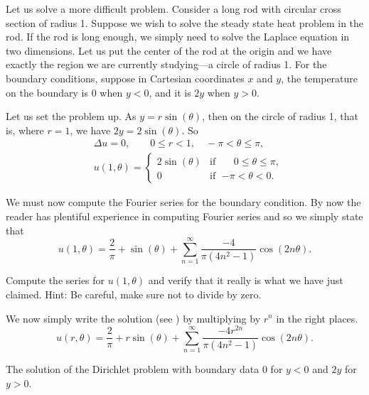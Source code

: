 \begin{example}
Let us solve a more difficult problem.  Consider a long
rod with circular cross section of radius 1.  Suppose we wish to solve the
steady state heat problem in the rod.
If the rod is long enough, we simply need to solve
the Laplace equation in two dimensions.  Let us put the center of the rod at
the origin and we have exactly the region we are currently
studying---a circle of radius 1.  For the boundary conditions, suppose in
Cartesian coordinates $x$ and
$y$, the temperature on the boundary is 0 when $y < 0$, and it is $2y$ when $y > 0$.

Let us set the problem up.
As $y = r\sin(\theta)$, then on the
circle of radius 1, that is, where $r=1$, we have $2y = 2\sin(\theta)$.  So
\begin{align*}
& \Delta u = 0 , \qquad 0 \leq r < 1, \quad -\pi < \theta \leq \pi,\\
& u(1,\theta) = 
\begin{cases}
2\sin(\theta) & \text{if } \; \phantom{-}0 \leq \theta \leq \pi, \\
0 & \text{if } \; {-\pi} < \theta < 0.
\end{cases}
\end{align*}

We must now compute the Fourier series for the boundary
condition.  By now the reader has plentiful experience in computing
Fourier series and so we simply state that 
\begin{equation*}
u(1,\theta) = 
\frac{2}{\pi}
+
\sin(\theta)
+
\sum_{n=1}^\infty \frac{-4}{\pi(4n^2-1)} \cos(2n\theta) .
\end{equation*}

\begin{exercise}
Compute the series for $u(1,\theta)$ and verify that it really is what
we have just claimed.  Hint: Be careful, make sure not to divide by zero.
\end{exercise}

We now simply write the solution (see ) by multiplying by $r^n$ in the right places.
\begin{equation*}
u(r,\theta) = 
\frac{2}{\pi}
+
r\sin(\theta)
+
\sum_{n=1}^\infty \frac{-4r^{2n}}{\pi(4n^2-1)} \cos(2n\theta) .
\end{equation*}
\begin{myfig}
\capstart
{}
\caption{The solution of the Dirichlet problem with
boundary data 0 for $y < 0$ and $2y$ for $y > 0$.\label{dirichdisc:zero2yfig}}
\end{myfig}
\end{example}

